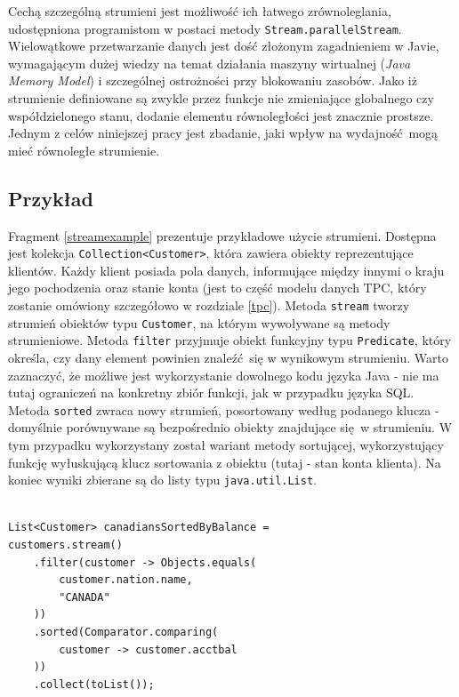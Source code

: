 \documentclass[12pt]{extarticle}
\begin{document}
    Cechą szczególną strumieni jest możliwość ich łatwego zrównoleglania, udostępniona programistom w postaci metody \texttt{Stream.parallelStream}. Wielowątkowe przetwarzanie danych jest dość złożonym zagadnieniem w Javie, wymagającym dużej wiedzy na temat działania maszyny wirtualnej (\textit{Java Memory Model}) i szczególnej ostrożności przy blokowaniu zasobów. Jako iż strumienie definiowane są zwykle przez funkcje nie zmieniające globalnego czy współdzielonego stanu, dodanie elementu równoległości jest znacznie prostsze. Jednym z celów niniejszej pracy jest zbadanie, jaki wpływ na wydajność mogą mieć równoległe strumienie.

\subsection{Przykład}

    Fragment \ref{streamexample} prezentuje przykładowe użycie strumieni. Dostępna jest kolekcja \newline \texttt{Collection<Customer>}, która zawiera obiekty reprezentujące klientów. Każdy klient posiada pola danych, informujące między innymi o kraju jego pochodzenia oraz stanie konta (jest to część modelu danych TPC, który zostanie omówiony szczegółowo w rozdziale \ref{tpc}). Metoda \texttt{stream} tworzy strumień obiektów typu \texttt{Customer}, na którym wywoływane są metody strumieniowe. Metoda \texttt{filter} przyjmuje obiekt funkcyjny typu \texttt{Predicate}, który określa, czy dany element powinien znaleźć się w wynikowym strumieniu. Warto zaznaczyć, że możliwe jest wykorzystanie dowolnego kodu języka Java - nie ma tutaj ograniczeń na konkretny zbiór funkcji, jak w przypadku języka SQL. Metoda \texttt{sorted} zwraca nowy strumień, posortowany według podanego klucza - domyślnie porównywane są bezpośrednio obiekty znajdujące się w strumieniu. W tym przypadku wykorzystany został wariant metody sortującej, wykorzystujący funkcję wyłuskującą klucz sortowania z obiektu (tutaj - stan konta klienta). Na koniec wyniki zbierane są do listy typu \texttt{java.util.List}. 

\begin{lstlisting}[label=streamexample, caption=Przykładowe wykorzystanie Stream API]

List<Customer> canadiansSortedByBalance = 
customers.stream()
    .filter(customer -> Objects.equals(
        customer.nation.name,
        "CANADA"
    ))
    .sorted(Comparator.comparing(
        customer -> customer.acctbal
    ))
    .collect(toList());

\end{lstlisting}
\end{document}

